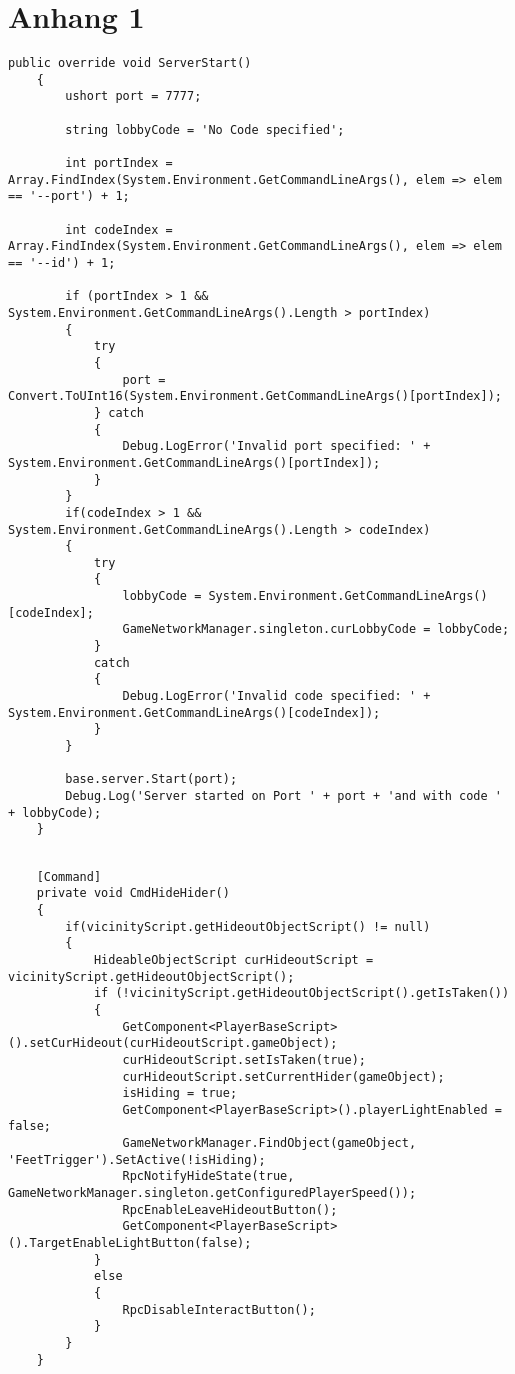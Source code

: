 \chapter{Anhang 1}

\begin{lstlisting}[caption= OwnKcpTransport.cs ServerStart()]
	public override void ServerStart()
	{
		ushort port = 7777;
		
		string lobbyCode = 'No Code specified';
		
		int portIndex = Array.FindIndex(System.Environment.GetCommandLineArgs(), elem => elem == '--port') + 1;
		
		int codeIndex = Array.FindIndex(System.Environment.GetCommandLineArgs(), elem => elem == '--id') + 1;
		
		if (portIndex > 1 && System.Environment.GetCommandLineArgs().Length > portIndex)
		{
			try
			{
				port = Convert.ToUInt16(System.Environment.GetCommandLineArgs()[portIndex]);
			} catch
			{
				Debug.LogError('Invalid port specified: ' + System.Environment.GetCommandLineArgs()[portIndex]);
			}
		}
		if(codeIndex > 1 && System.Environment.GetCommandLineArgs().Length > codeIndex)
		{
			try
			{
				lobbyCode = System.Environment.GetCommandLineArgs()[codeIndex];
				GameNetworkManager.singleton.curLobbyCode = lobbyCode;
			}
			catch
			{
				Debug.LogError('Invalid code specified: ' + System.Environment.GetCommandLineArgs()[codeIndex]);
			}
		}
		
		base.server.Start(port);
		Debug.Log('Server started on Port ' + port + 'and with code ' + lobbyCode);
	}
\end{lstlisting}

\begin{lstlisting}[caption= HiderScript.cs Subscribe to InGameUiControllerScript Event]
	
	[Command]
	private void CmdHideHider()
	{
		if(vicinityScript.getHideoutObjectScript() != null)
		{
			HideableObjectScript curHideoutScript = vicinityScript.getHideoutObjectScript();
			if (!vicinityScript.getHideoutObjectScript().getIsTaken())
			{
				GetComponent<PlayerBaseScript>().setCurHideout(curHideoutScript.gameObject);
				curHideoutScript.setIsTaken(true);
				curHideoutScript.setCurrentHider(gameObject);
				isHiding = true;
				GetComponent<PlayerBaseScript>().playerLightEnabled = false;
				GameNetworkManager.FindObject(gameObject, 'FeetTrigger').SetActive(!isHiding);
				RpcNotifyHideState(true, GameNetworkManager.singleton.getConfiguredPlayerSpeed());
				RpcEnableLeaveHideoutButton();
				GetComponent<PlayerBaseScript>().TargetEnableLightButton(false);
			}
			else
			{
				RpcDisableInteractButton();
			}
		}
	}	
\end{lstlisting}

